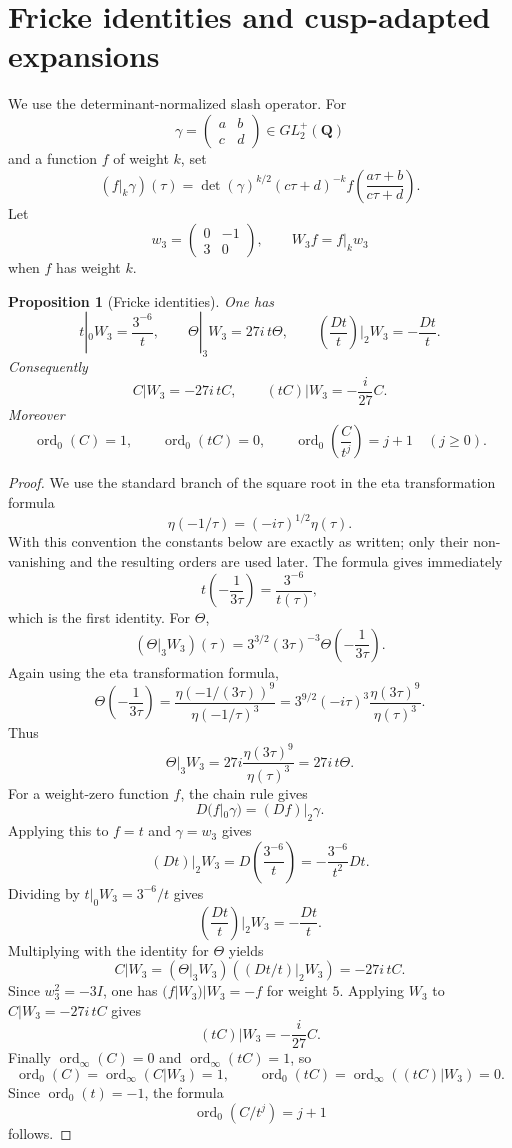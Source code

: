 \documentclass[11pt]{amsart}
\newtheorem{proposition}[theorem]{Proposition}
\theoremstyle{remark}
\DeclareMathOperator{\ord}{ord}
\newcommand{\Q}{\mathbf Q}
\begin{document}
\section{Fricke identities and cusp-adapted expansions}\label{sec:fricke}

We use the determinant-normalized slash operator.  For
\[
 \gamma=\begin{pmatrix}a&b\\c&d\end{pmatrix}\in GL_2^+(\Q)
\]
and a function $f$ of weight $k$, set
\[
 (f|_k\gamma)(\tau)
 =\det(\gamma)^{k/2}(c\tau+d)^{-k}f\left(\frac{a\tau+b}{c\tau+d}\right).
\]
Let
\[
 w_3=\begin{pmatrix}0&-1\\3&0\end{pmatrix},
 \qquad
 W_3f=f|_kw_3
\]
when $f$ has weight $k$.

\begin{proposition}[Fricke identities]\label{prop:fricke-C}
One has
\[
 t|_0W_3=\frac{3^{-6}}{t},
 \qquad
 \Theta|_3W_3=27i\,t\Theta,
 \qquad
 \left(\frac{Dt}{t}\right)\!\Big|_2W_3=-\frac{Dt}{t}.
\]
Consequently
\[
 C|W_3=-27i\,tC,
 \qquad
 (tC)|W_3=-\frac{i}{27}C.
\]
Moreover
\[
 \ord_0(C)=1,
 \qquad
 \ord_0(tC)=0,
 \qquad
 \ord_0\left(\frac{C}{t^j}\right)=j+1\quad(j\ge0).
\]
\end{proposition}

\begin{proof}
We use the standard branch of the square root in the eta transformation formula
\[
 \eta(-1/\tau)=(-i\tau)^{1/2}\eta(\tau).
\]
With this convention the constants below are exactly as written; only their non-vanishing and the resulting orders are used later.
The formula gives immediately
\[
 t\left(-\frac{1}{3\tau}\right)=\frac{3^{-6}}{t(\tau)},
\]
which is the first identity.
For $\Theta$,
\[
 (\Theta|_3W_3)(\tau)=3^{3/2}(3\tau)^{-3}\Theta\left(-\frac{1}{3\tau}\right).
\]
Again using the eta transformation formula,
\[
 \Theta\left(-\frac{1}{3\tau}\right)
 =\frac{\eta(-1/(3\tau))^9}{\eta(-1/\tau)^3}
 =3^{9/2}(-i\tau)^3\frac{\eta(3\tau)^9}{\eta(\tau)^3}.
\]
Thus
\[
 \Theta|_3W_3=27i\frac{\eta(3\tau)^9}{\eta(\tau)^3}=27i\,t\Theta.
\]
For a weight-zero function $f$, the chain rule gives
\[
 D(f|_0\gamma)=(Df)|_2\gamma.
\]
Applying this to $f=t$ and $\gamma=w_3$ gives
\[
 (Dt)|_2W_3=D\left(\frac{3^{-6}}{t}\right)
 =-\frac{3^{-6}}{t^2}Dt.
\]
Dividing by $t|_0W_3=3^{-6}/t$ gives
\[
 \left(\frac{Dt}{t}\right)\!\Big|_2W_3=-\frac{Dt}{t}.
\]
Multiplying with the identity for $\Theta$ yields
\[
 C|W_3=(\Theta|_3W_3)\left((Dt/t)|_2W_3\right)=-27i\,tC.
\]
Since $w_3^2=-3I$, one has $(f|W_3)|W_3=-f$ for weight $5$.  Applying $W_3$ to $C|W_3=-27i\,tC$ gives
\[
 (tC)|W_3=-\frac{i}{27}C.
\]
Finally $\ord_\infty(C)=0$ and $\ord_\infty(tC)=1$, so
\[
 \ord_0(C)=\ord_\infty(C|W_3)=1,
 \qquad
 \ord_0(tC)=\ord_\infty((tC)|W_3)=0.
\]
Since $\ord_0(t)=-1$, the formula
\[
 \ord_0(C/t^j)=j+1
\]
follows.
\end{proof}
\end{document}
